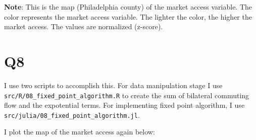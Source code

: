 \documentclass[
  11pt]{article}
\begin{document}
\begin{figure}
\begin{minipage}{0.50\linewidth}
{}


\end{minipage}%

\end{figure}%

\footnotesize \textbf{Note}: This is the map (Philadelphia county) of
the market access variable. The color represents the market access
variable. The lighter the color, the higher the market access. The
values are normalized (z-score).

\normalsize

\clearpage

\section*{Q8}\label{q8}

I use two scripts to accomplish this. For data manipulation stage I use
\texttt{src/R/08\_fixed\_point\_algorithm.R} to create the sum of
bilateral commuting flow and the expotential terms. For implementing
fixed point algorithm, I use
\texttt{src/julia/08\_fixed\_point\_algorithm.jl}.

I plot the map of the market access again below:
\end{document}
